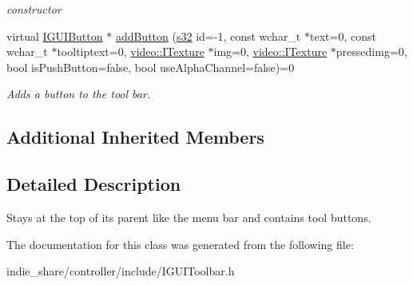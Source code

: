 \begin{DoxyCompactItemize}
\begin{DoxyCompactList}\small\item\em constructor \end{DoxyCompactList}\item 
\mbox{\label{classirr_1_1gui_1_1IGUIToolBar_ae7072e7db92448c0feca015d358a8fe4}} 
virtual \hyperlink{classirr_1_1gui_1_1IGUIButton}{I\+G\+U\+I\+Button} $\ast$ \hyperlink{classirr_1_1gui_1_1IGUIToolBar_ae7072e7db92448c0feca015d358a8fe4}{add\+Button} (\hyperlink{namespaceirr_ac66849b7a6ed16e30ebede579f9b47c6}{s32} id=-\/1, const wchar\+\_\+t $\ast$text=0, const wchar\+\_\+t $\ast$tooltiptext=0, \hyperlink{classirr_1_1video_1_1ITexture}{video\+::\+I\+Texture} $\ast$img=0, \hyperlink{classirr_1_1video_1_1ITexture}{video\+::\+I\+Texture} $\ast$pressedimg=0, bool is\+Push\+Button=false, bool use\+Alpha\+Channel=false)=0
\begin{DoxyCompactList}\small\item\em Adds a button to the tool bar. \end{DoxyCompactList}\end{DoxyCompactItemize}
\subsection*{Additional Inherited Members}


\subsection{Detailed Description}
Stays at the top of its parent like the menu bar and contains tool buttons. 

The documentation for this class was generated from the following file\+:\begin{DoxyCompactItemize}
\item 
indie\+\_\+share/controller/include/I\+G\+U\+I\+Toolbar.\+h\end{DoxyCompactItemize}
